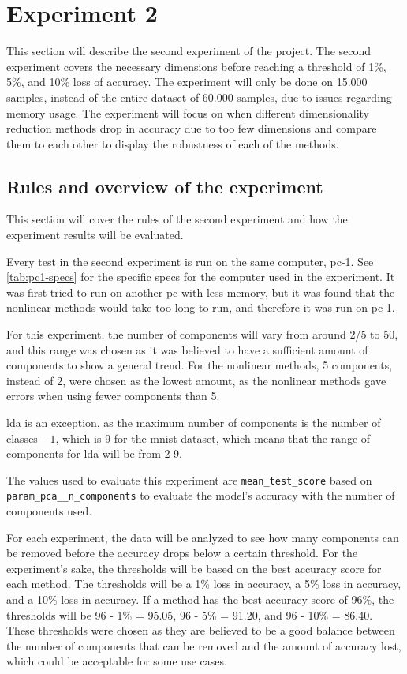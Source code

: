 \section{Experiment 2}\label{sec:experiment-2}
This section will describe the second experiment of the project. The second experiment covers the necessary dimensions before reaching a threshold of 1\%, 5\%, and 10\% loss of accuracy. The experiment will only be done on 15.000 samples, instead of the entire dataset of 60.000 samples, due to issues regarding memory usage. The experiment will focus on when different dimensionality reduction methods drop in accuracy due to too few dimensions and compare them to each other to display the robustness of each of the methods.


\subsection{Rules and overview of the experiment}\label{subsec:experiment_2_rules}
This section will cover the rules of the second experiment and how the experiment results will be evaluated.

Every test in the second experiment is run on the same computer, pc-1. See \autoref{tab:pc1-specs} for the specific specs for the computer used in the experiment. It was first tried to run on another pc with less memory, but it was found that the nonlinear methods would take too long to run, and therefore it was run on pc-1.

For this experiment, the number of components will vary from around 2/5 to 50, and this range was chosen as it was believed to have a sufficient amount of components to show a general trend. For the nonlinear methods, 5 components, instead of 2, were chosen as the lowest amount, as the nonlinear methods gave errors when using fewer components than 5.

\gls{lda} is an exception, as the maximum number of components is the number of classes $-1$, which is 9 for the \gls{mnist} dataset, which means that the range of components for \gls{lda} will be from 2-9.

The values used to evaluate this experiment are \texttt{mean\_test\_score} based on \texttt{param\_pca\_\_n\_components} to evaluate the model's accuracy with the number of components used.

For each experiment, the data will be analyzed to see how many components can be removed before the accuracy drops below a certain threshold. For the experiment's sake, the thresholds will be based on the best accuracy score for each method. The thresholds will be a 1\% loss in accuracy, a 5\% loss in accuracy, and a 10\% loss in accuracy. If a method has the best accuracy score of 96\%, the thresholds will be 96 - 1\% = 95.05, 96 - 5\% = 91.20, and 96 - 10\% = 86.40. These thresholds were chosen as they are believed to be a good balance between the number of components that can be removed and the amount of accuracy lost, which could be acceptable for some use cases.


